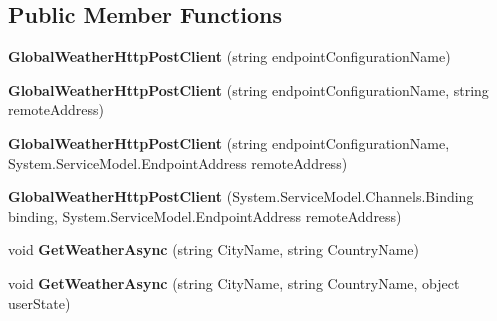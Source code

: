 \subsection*{Public Member Functions}
\begin{DoxyCompactItemize}
\item 
\hypertarget{class_silverlight_showcase_1_1_sample_weather_service_1_1_global_weather_http_post_client_a070148445845338fcceb2f57c392af72}{
{\bfseries GlobalWeatherHttpPostClient} (string endpointConfigurationName)}
\label{class_silverlight_showcase_1_1_sample_weather_service_1_1_global_weather_http_post_client_a070148445845338fcceb2f57c392af72}

\item 
\hypertarget{class_silverlight_showcase_1_1_sample_weather_service_1_1_global_weather_http_post_client_aadd46448589b47c2f37118b1e73a3fe9}{
{\bfseries GlobalWeatherHttpPostClient} (string endpointConfigurationName, string remoteAddress)}
\label{class_silverlight_showcase_1_1_sample_weather_service_1_1_global_weather_http_post_client_aadd46448589b47c2f37118b1e73a3fe9}

\item 
\hypertarget{class_silverlight_showcase_1_1_sample_weather_service_1_1_global_weather_http_post_client_a6afa8a36b98c48ad9159cd1ea679703c}{
{\bfseries GlobalWeatherHttpPostClient} (string endpointConfigurationName, System.ServiceModel.EndpointAddress remoteAddress)}
\label{class_silverlight_showcase_1_1_sample_weather_service_1_1_global_weather_http_post_client_a6afa8a36b98c48ad9159cd1ea679703c}

\item 
\hypertarget{class_silverlight_showcase_1_1_sample_weather_service_1_1_global_weather_http_post_client_a5d7d9b5cf3a9a041448ee146faea9be4}{
{\bfseries GlobalWeatherHttpPostClient} (System.ServiceModel.Channels.Binding binding, System.ServiceModel.EndpointAddress remoteAddress)}
\label{class_silverlight_showcase_1_1_sample_weather_service_1_1_global_weather_http_post_client_a5d7d9b5cf3a9a041448ee146faea9be4}

\item 
\hypertarget{class_silverlight_showcase_1_1_sample_weather_service_1_1_global_weather_http_post_client_a8e5fabbd604e62de8f96b82c540511d0}{
void {\bfseries GetWeatherAsync} (string CityName, string CountryName)}
\label{class_silverlight_showcase_1_1_sample_weather_service_1_1_global_weather_http_post_client_a8e5fabbd604e62de8f96b82c540511d0}

\item 
\hypertarget{class_silverlight_showcase_1_1_sample_weather_service_1_1_global_weather_http_post_client_ae15567bb017535c310ad6154e6066934}{
void {\bfseries GetWeatherAsync} (string CityName, string CountryName, object userState)}
\label{class_silverlight_showcase_1_1_sample_weather_service_1_1_global_weather_http_post_client_ae15567bb017535c310ad6154e6066934}


\end{DoxyCompactItemize}

